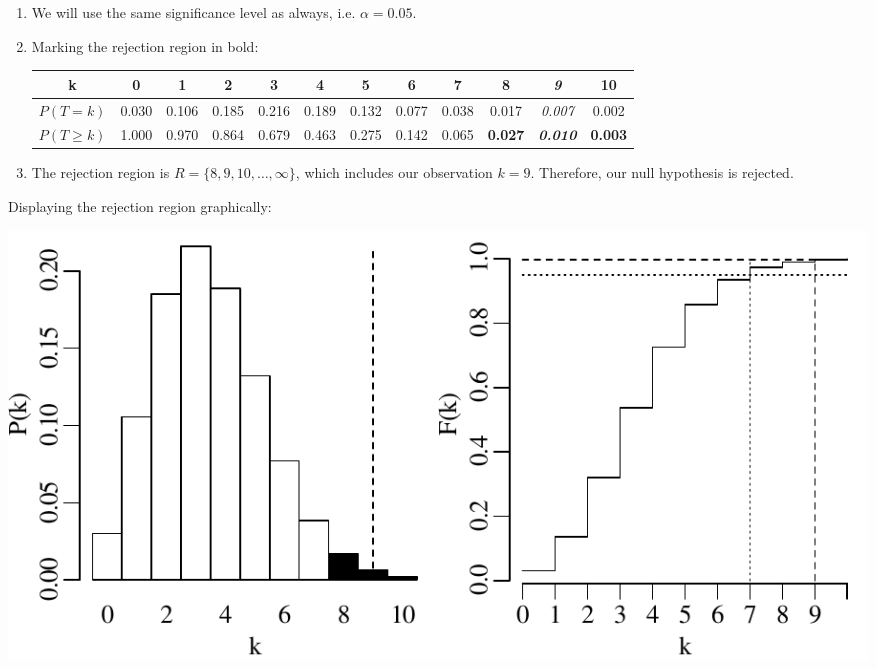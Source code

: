 \begin{enumerate}
\item We will use the same significance level as always,
  i.e. $\alpha=0.05$.

\item Marking the rejection region in bold:

  \begin{tabular}{c@{~}c@{~}c@{~}c@{~}c@{~}c@{~}c@{~}c@{~}c@{~}c@{~}c@{~}c}
    k & 0 & 1 & 2 & 3 & 4 & 5 & 6 & 7 & \textbf{8} &
    \textbf{\textit{9}} & \textbf{10} \\ \hline
    $P(T=k)$ & 0.030 & 0.106 & 0.185 & 0.216 & 0.189 &
    0.132 & 0.077 & 0.038 & 0.017 & \textit{0.007} & 0.002 \\
    $P({T}\geq{k})$ & 1.000 & 0.970 & 0.864 & 0.679 & 0.463 &
    0.275 & 0.142 & 0.065 & \textbf{0.027} & \textbf{\textit{0.010}} &
    \textbf{0.003} \\
  \end{tabular}

\item\label{it:poisl351sided} The rejection region is $R =
  \{8,9,10,\ldots,\infty\}$, which includes our observation
  $k=9$. Therefore, our null hypothesis is rejected.

\end{enumerate}

Displaying the rejection region graphically:

\noindent\begin{minipage}[t][][b]{.6\textwidth}
  \includegraphics[]{../figures/poishyp.pdf}\medskip
\end{minipage}
\begin{minipage}[t][][t]{.4\textwidth}
  \label{fig:poishyp}
\end{minipage}


